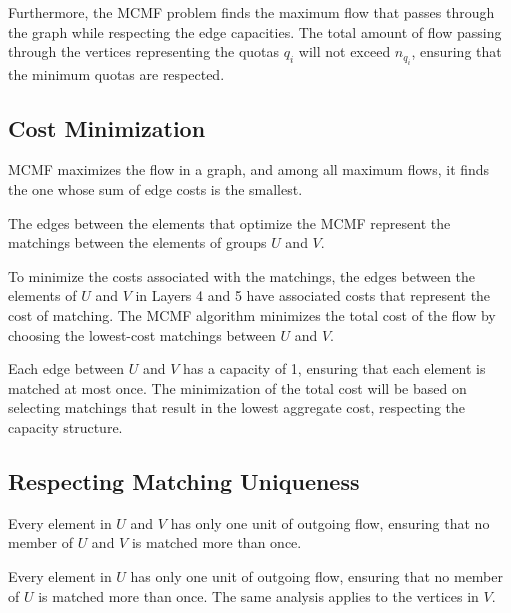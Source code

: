         Furthermore, the MCMF problem finds the maximum flow that passes through the graph while respecting the edge capacities. The total amount of flow passing through the vertices representing the quotas $q_i$ will not exceed $n_{q_i}$, ensuring that the minimum quotas are respected.
        
        \subsection{Cost Minimization}
        
        \begin{lemma}
           \cite{edmonds1972theoretical} MCMF maximizes the flow in a graph, and among all maximum flows, it finds the one whose sum of edge costs is the smallest.
        \end{lemma}
        
        \begin{lemma}
           \cite{edmonds1972theoretical} The edges between the elements that optimize the MCMF represent the matchings between the elements of groups $U$ and $V$.
        \end{lemma}
        
        To minimize the costs associated with the matchings, the edges between the elements of $U$ and $V$ in Layers 4 and 5 have associated costs that represent the cost of matching. The MCMF algorithm minimizes the total cost of the flow by choosing the lowest-cost matchings between $U$ and $V$.
        
        Each edge between $U$ and $V$ has a capacity of 1, ensuring that each element is matched at most once. The minimization of the total cost will be based on selecting matchings that result in the lowest aggregate cost, respecting the capacity structure.
        
        \subsection{Respecting Matching Uniqueness}
        
        \begin{lemma}
           Every element in $U$ and $V$ has only one unit of outgoing flow, ensuring that no member of $U$ and $V$ is matched more than once.
        \end{lemma}
        
        Every element in $U$ has only one unit of outgoing flow, ensuring that no member of $U$ is matched more than once. The same analysis applies to the vertices in $V$.
        
